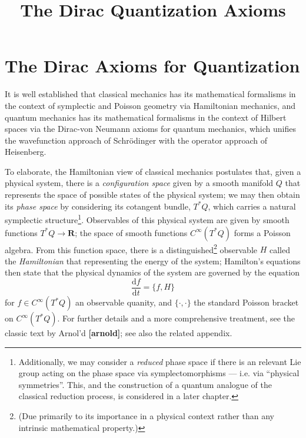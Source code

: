 \documentclass{tufte-handout}
\title{The Dirac Quantization Axioms}
\def \d {\mathrm{d}}
\begin{document}
\section{The Dirac Axioms for Quantization}
It is well established that classical mechanics has its mathematical formalisms in the context of symplectic and Poisson geometry via Hamiltonian mechanics, and quantum mechanics has its mathematical formalisms in the context of Hilbert spaces via the Dirac-von Neumann axioms for quantum mechanics, which unifies the wavefunction approach of Schr\"{o}dinger with the operator approach of Heisenberg.

To elaborate, the Hamiltonian view of classical mechanics postulates that, given a physical system, there is a \emph{configuration space} given by a smooth manifold $Q$ that represents the space of possible states of the physical system; we may then obtain its \emph{phase space} by considering its cotangent bundle, $T^*Q$, which carries a natural symplectic structure\footnote{Additionally, we may consider a \emph{reduced} phase space if there is an relevant Lie group acting on the phase space via symplectomorphisms --- i.e. via ``physical symmetries''. This, and the construction of a quantum analogue of the classical reduction process, is considered in a later chapter.}. Observables of this physical system are given by smooth functions $T^*Q \to \mathbf{R}$; the space of smooth functions $C^\infty(T^*Q)$ forms a Poisson algebra. From this function space, there is a distinguished\footnote{(Due primarily to its importance in a physical context rather than any intrinsic mathematical property.)} observable $H$ called the \emph{Hamiltonian} that representing the energy of the system; Hamilton's equations then state that the physical dynamics of the system are governed by the equation
$$
\frac{\d f}{\d t} = \{f,H\}
$$
for $f \in C^\infty(T^*Q)$ an observable quanity, and $\{\cdot,\cdot\}$ the standard Poisson bracket on $C^\infty(T^*Q)$.
For further details and a more comprehensive treatment, see the classic text by Arnol'd \textbf{[arnold]}; see also the related appendix.
\end{document}
